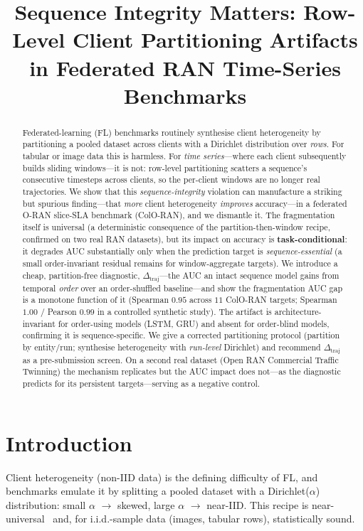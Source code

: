 \documentclass[conference]{IEEEtran}
\newcommand{\dtraj}{\Delta_{\mathrm{traj}}}
\begin{document}
\title{Sequence Integrity Matters: Row-Level Client Partitioning Artifacts in Federated RAN Time-Series Benchmarks}
\author{}
\maketitle

\begin{abstract}
Federated-learning (FL) benchmarks routinely synthesise client heterogeneity by partitioning a pooled
dataset across clients with a Dirichlet distribution over \emph{rows}. For tabular or image data this is
harmless. For \emph{time series}---where each client subsequently builds sliding windows---it is not:
row-level partitioning scatters a sequence's consecutive timesteps across clients, so the per-client
windows are no longer real trajectories. We show that this \emph{sequence-integrity} violation can
manufacture a striking but spurious finding---that \emph{more} client heterogeneity \emph{improves}
accuracy---in a federated O-RAN slice-SLA benchmark (ColO-RAN), and we dismantle it. The fragmentation
itself is universal (a deterministic consequence of the partition-then-window recipe, confirmed on two
real RAN datasets), but its impact on accuracy is \textbf{task-conditional}: it degrades AUC
substantially only when the prediction target is \emph{sequence-essential} (a small order-invariant
residual remains for window-aggregate targets). We introduce a cheap, partition-free diagnostic,
$\dtraj$---the AUC an intact sequence model gains from temporal \emph{order} over an order-shuffled
baseline---and show the fragmentation AUC gap is a monotone function of it (Spearman $0.95$ across $11$
ColO-RAN targets; Spearman $1.00$ / Pearson $0.99$ in a controlled synthetic study). The artifact is
architecture-invariant for order-using models (LSTM, GRU) and absent for order-blind models, confirming
it is sequence-specific. We give a corrected partitioning protocol (partition by entity/run; synthesise
heterogeneity with \emph{run-level} Dirichlet) and recommend $\dtraj$ as a pre-submission screen. On a
second real dataset (Open RAN Commercial Traffic Twinning) the mechanism replicates but the AUC impact
does not---as the diagnostic predicts for its persistent targets---serving as a negative control.
\end{abstract}

\section{Introduction}
Client heterogeneity (non-IID data) is the defining difficulty of FL, and benchmarks emulate it by
splitting a pooled dataset with a Dirichlet($\alpha$) distribution: small $\alpha$ $\rightarrow$ skewed,
large $\alpha$ $\rightarrow$ near-IID. This recipe is near-universal~\cite{Hsu2019_Dirichlet,
Li2022_NIIDBench,Beutel2020_Flower} and, for i.i.d.-sample data (images, tabular rows), statistically
sound.
\end{document}
